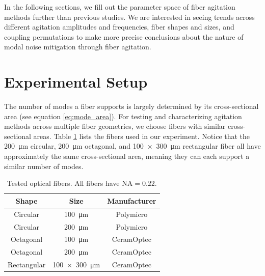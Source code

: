 \documentclass[twocolumn]{emulateapj}
\begin{document}
In the following sections, we fill out the parameter space of fiber agitation methods further than previous studies. We are interested in seeing trends across different agitation amplitudes and frequencies, fiber shapes and sizes, and coupling permutations to make more precise conclusions about the nature of modal noise mitigation through fiber agitation.

\section{Experimental Setup}
\label{sec:experimental_setup}

The number of modes a fiber supports is largely determined by its cross-sectional area (see equation \ref{eq:mode_area}). For testing and characterizing agitation methods across multiple fiber geometries, we choose fibers with similar cross-sectional areas. Table \ref{table:fibers} lists the fibers used in our experiment. Notice that the \SI{200}{\micro\meter} circular, \SI{200}{\micro\meter} octagonal, and \SI{100x300}{\micro\meter} rectangular fiber all have approximately the same cross-sectional area, meaning they can each support a similar number of modes.

\begin{table}
\centering
\caption{Tested optical fibers. All fibers have $\mathrm{NA} = 0.22$.}
	\begin{tabular}{ccc}
	\hline
	Shape & Size & Manufacturer \\
	\hline
	\hline
	Circular & \SI{100}{\micro\meter} & Polymicro \\
	Circular & \SI{200}{\micro\meter} & Polymicro \\
	Octagonal & \SI{100}{\micro\meter} & CeramOptec \\
	Octagonal & \SI{200}{\micro\meter} & CeramOptec \\
	Rectangular & \SI{100x300}{\micro\meter} & CeramOptec \\
	\hline
	\end{tabular}
\label{table:fibers}
\end{table}
\end{document}

